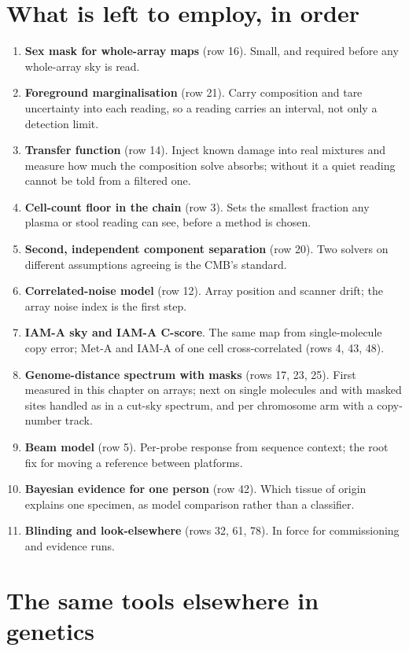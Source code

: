 \section{What is left to employ, in order}

\begin{enumerate}
\item \textbf{Sex mask for whole-array maps} (row 16). Small, and required before any whole-array sky is read.
\item \textbf{Foreground marginalisation} (row 21). Carry composition and tare uncertainty into each reading, so a reading carries an interval,
not only a detection limit.
\item \textbf{Transfer function} (row 14). Inject known damage into real mixtures and measure how much the composition solve absorbs; without it
a quiet reading cannot be told from a filtered one.
\item \textbf{Cell-count floor in the chain} (row 3). Sets the smallest fraction any plasma or stool reading can see, before a method is chosen.
\item \textbf{Second, independent component separation} (row 20). Two solvers on different assumptions agreeing is the CMB's standard.
\item \textbf{Correlated-noise model} (row 12). Array position and scanner drift; the array noise index is the first step.
\item \textbf{IAM-A sky and IAM-A C-score}. The same map from single-molecule copy error; Met-A and IAM-A of one cell cross-correlated (rows 4,
43, 48).
\item \textbf{Genome-distance spectrum with masks} (rows 17, 23, 25). First measured in this chapter on arrays; next on single molecules and
with masked sites handled as in a cut-sky spectrum, and per chromosome arm with a copy-number track.
\item \textbf{Beam model} (row 5). Per-probe response from sequence context; the root fix for moving a reference between platforms.
\item \textbf{Bayesian evidence for one person} (row 42). Which tissue of origin explains one specimen, as model comparison rather than a
classifier.
\item \textbf{Blinding and look-elsewhere} (rows 32, 61, 78). In force for commissioning and evidence runs.
\end{enumerate}

\section{The same tools elsewhere in genetics}

